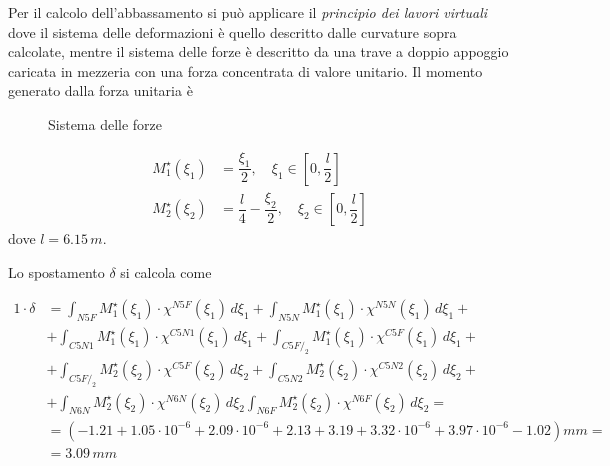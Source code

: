 Per il calcolo dell'abbassamento si può applicare il \emph{principio dei lavori virtuali} dove il sistema delle deformazioni è quello descritto dalle curvature sopra calcolate, mentre il sistema delle forze è descritto da una trave a doppio appoggio caricata in mezzeria con una forza concentrata di valore unitario. Il momento generato dalla forza unitaria è


\begin{figure}
    \centering
	\caption{Sistema delle forze}
	\label{fig:plv_sistemaForze}
\end{figure}

\begin{align*}
M^\star_1 (\xi_1) &= \dfrac{\xi_1}{2}, \quad \xi_1 \in \left[0, \dfrac{l}{2}\right]\\
M^\star_2 (\xi_2) &= \dfrac{l}{4} - \dfrac{\xi_2}{2}, \quad \xi_2 \in \left[0, \dfrac{l}{2}\right]
\end{align*}
dove $l = 6.15\,m$.

Lo spostamento $\delta$ si calcola come

\begin{align*}
1\cdot \delta &= \int_{N5F} M_1^\star (\xi_1) \cdot \chi^{N5F}(\xi_1)\,d\xi_1 + \int_{N5N} M_1^\star (\xi_1) \cdot \chi^{N5N}(\xi_1)\,d\xi_1 +\\
&+ \int_{C5N1} M_1^\star (\xi_1) \cdot \chi^{C5N1}(\xi_1)\,d\xi_1 + \int_{C5F/_2} M_1^\star (\xi_1) \cdot \chi^{C5F}(\xi_1)\,d\xi_1 +\\
&+\int_{C5F/_2} M_2^\star (\xi_2) \cdot \chi^{C5F}(\xi_2)\,d\xi_2 + 
\int_{C5N2} M_2^\star (\xi_2) \cdot \chi^{C5N2}(\xi_2)\,d\xi_2 + \\
&+ \int_{N6N} M_2^\star (\xi_2) \cdot \chi^{N6N}(\xi_2)\,d\xi_2
\int_{N6F} M_2^\star (\xi_2) \cdot \chi^{N6F}(\xi_2)\,d\xi_2 = \\
	&= \left(-1.21 + 1.05\cdot 10^{-6} + 2.09\cdot 10^{-6}+ 2.13 + 3.19 + 3.32\cdot 10^{-6} + 3.97\cdot 10^{-6} -1.02\right)mm = \\
	&= 3.09\,mm
\end{align*}

